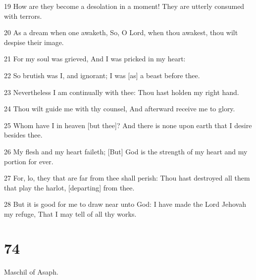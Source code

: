 \par 19 How are they become a desolation in a moment! They are utterly consumed with terrors.
\par 20 As a dream when one awaketh, So, O Lord, when thou awakest, thou wilt despise their image.
\par 21 For my soul was grieved, And I was pricked in my heart:
\par 22 So brutish was I, and ignorant; I was [as] a beast before thee.
\par 23 Nevertheless I am continually with thee: Thou hast holden my right hand.
\par 24 Thou wilt guide me with thy counsel, And afterward receive me to glory.
\par 25 Whom have I in heaven [but thee]? And there is none upon earth that I desire besides thee.
\par 26 My flesh and my heart faileth; [But] God is the strength of my heart and my portion for ever.
\par 27 For, lo, they that are far from thee shall perish: Thou hast destroyed all them that play the harlot, [departing] from thee.
\par 28 But it is good for me to draw near unto God: I have made the Lord Jehovah my refuge, That I may tell of all thy works.

\chapter{74}

\par Maschil of Asaph.

